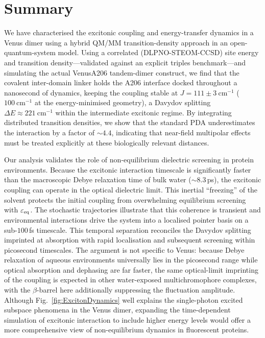\documentclass[journal=jpcbfk, manuscript=article, layout=twocolumn, doi=true]{achemso}
\begin{document}
\section{Summary}

We have characterised the excitonic coupling and energy-transfer dynamics in a Venus dimer using a hybrid QM/MM transition-density approach in an open-quantum-system model. Using a correlated (DLPNO-STEOM-CCSD) site energy and transition density---validated against an explicit triples benchmark---and simulating the actual VenusA206 tandem-dimer construct, we find that the covalent inter-domain linker holds the A206 interface docked throughout a nanosecond of dynamics, keeping the coupling stable at $J = 111 \pm 3~\mathrm{cm^{-1}}$ ($100~\mathrm{cm^{-1}}$ at the energy-minimised geometry), a Davydov splitting $\Delta E \approx 221~\mathrm{cm^{-1}}$ within the intermediate excitonic regime. By integrating distributed transition densities, we show that the standard PDA underestimates the interaction by a factor of $\sim 4.4$, indicating that near-field multipolar effects must be treated explicitly at these biologically relevant distances.

Our analysis validates the role of non-equilibrium dielectric screening in protein environments. Because the excitonic interaction timescale is significantly faster than the macroscopic Debye relaxation time of bulk water ($\sim 8.3$\,ps), the excitonic coupling can operate in the optical dielectric limit. This inertial ``freezing'' of the solvent protects the initial coupling from overwhelming equilibrium screening with $\varepsilon_{\rm eq}$. The stochastic trajectories illustrate that this coherence is transient and environmental interactions drive the system into a localised pointer basis on a sub-$100$\,fs timescale. This temporal separation reconciles the Davydov splitting imprinted at absorption with rapid localisation and subsequent screening within picosecond timescales. The argument is not specific to Venus: because Debye relaxation of aqueous environments universally lies in the picosecond range while optical absorption and dephasing are far faster, the same optical-limit imprinting of the coupling is expected in other water-exposed multichromophore complexes, with the $\beta$-barrel here additionally suppressing the fluctuation amplitude. Although Fig.~\ref{fig:ExcitonDynamics} well explains the single-photon excited subspace phenomena in the Venus dimer, expanding the time-dependent simulation of excitonic interaction to include higher energy levels would offer a more comprehensive view of non-equilibrium dynamics in fluorescent proteins.
\end{document}
